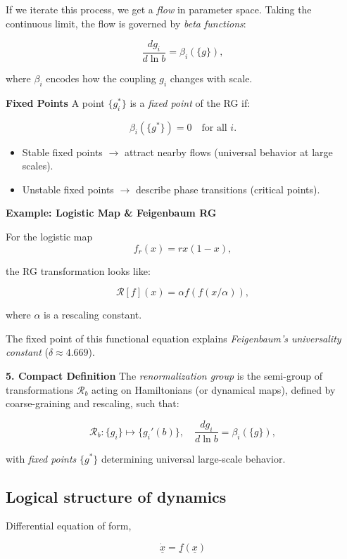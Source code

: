 If we iterate this process, we get a \emph{flow} in parameter space.  
Taking the continuous limit, the flow is governed by \emph{beta functions}:

\[
    \frac{dg_i}{d\ln b} = \beta_i(\{ g \}),
\]

where $\beta_i$ encodes how the coupling $g_i$ changes with scale.

\textbf{Fixed Points}
A point $\{ g_i^* \}$ is a \emph{fixed point} of the RG if:

\[
    \beta_i(\{ g^* \}) = 0 \quad \text{for all } i.
\]

\begin{itemize}
    \item Stable fixed points $\to$ attract nearby flows (universal behavior at large scales).
    \item Unstable fixed points $\to$ describe phase transitions (critical points).
\end{itemize}

\textbf{Example: Logistic Map \& Feigenbaum RG}

For the logistic map
\[
    f_r(x) = r x (1-x),
\]

the RG transformation looks like:

\[
    \mathcal{R}[f](x) = \alpha f(f(x/\alpha)),
\]

where $\alpha$ is a rescaling constant.  

The fixed point of this functional equation explains \emph{Feigenbaum’s universality constant} 
($\delta \approx 4.669$).

\textbf{5. Compact Definition}
The \emph{renormalization group} is the semi-group of transformations $\mathcal{R}_b$ acting on Hamiltonians (or dynamical maps), defined by coarse-graining and rescaling, such that:

\[
    \mathcal{R}_b : \{ g_i \} \mapsto \{ g_i'(b) \}, 
    \quad 
    \frac{dg_i}{d\ln b} = \beta_i(\{g\}),
\]

with \emph{fixed points} $\{g^*\}$ determining universal large-scale behavior.

\subsection{Logical structure of dynamics}
Differential equation of form,

\[
    \dot{\underline{x}} = \underline{f}(\underline{x})
\]



